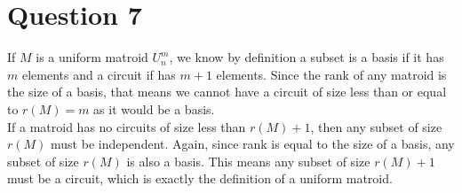 \documentclass[a4paper, fleqn]{article}
\begin{document}
\section*{Question 7}
If $M$ is a uniform matroid $U^m_n$, we know by definition a subset is a basis if it has
$m$ elements and a circuit if has $m+1$ elements. Since the rank of any matroid is the
size of a basis, that means we cannot have a circuit of size less than or equal to $r(M)=m$ as it would be a basis. \\
If a matroid has no circuits of size less than $r(M)+1$, then any subset of size $r(M)$
must be independent. Again, since rank is equal to the size of a basis, any subset of
size $r(M)$ is also a basis. This means any subset of size $r(M)+1$ must be a circuit,
which is exactly the definition of a uniform matroid.
\end{document}
